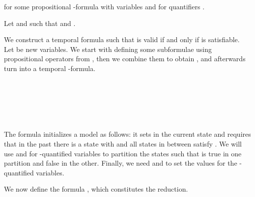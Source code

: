         for some propositional -formula  with variables  and for quantifiers .

        Let  and
         such that  and .

        We construct a temporal formula  such that  is valid if and only if  is satisfiable. Let  be new variables. We start with defining some subformulae using propositional operators from , then we combine them to obtain , and afterwards turn  into a temporal -formula.

        \begin{small}
          ~\par\vspace{-1.3\baselineskip}
          
          ~\par\vspace{-1.0\baselineskip}
          \begin{minipage}{.52\textwidth}
            
          \end{minipage}
          \hspace{-.12\textwidth}
          \begin{minipage}{.53\textwidth}
            
          \end{minipage}
          ~\par\vspace{.3\baselineskip}
          \begin{minipage}{.48\textwidth}
            
          \end{minipage}
          \hspace{-.02\textwidth}
          \begin{minipage}{.48\textwidth}
            
          \end{minipage}
        \par\bigskip
        \end{small}

        The formula  initializes a model as follows: it sets  in the current state and requires that in the past there is a state with  and all states in between satisfy . We will use  and  for -quantified variables  to partition the states such that  is true in one partition and false in the other. Finally, we need  and  to set the values for the -quantified variables.

        We now define the formula , which constitutes the reduction.

